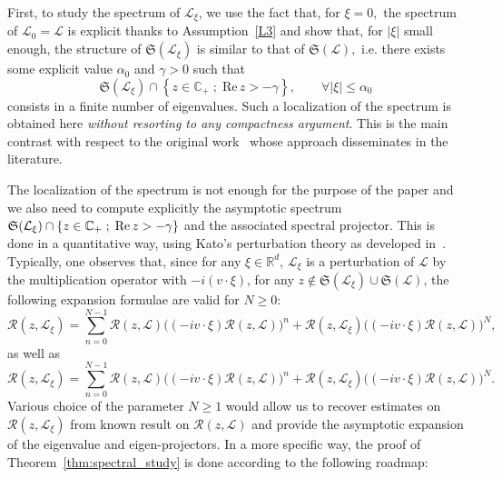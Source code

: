 \documentclass[AHL,Unicode,longabstracts,published]{cedram}
\newcommand{\re}{\mathrm{Re}\,}
\newcommand{\R}{\mathbb{R}}
\newcommand{\C}{\mathbb{C}}
\newcommand{\fkS}{\mathfrak{S}}
\newcommand{\LL}{\mathcal{L}}
\newcommand{\RR}{\mathcal{R}}
\renewcommand*\le{\leqslant}
\renewcommand*\ge{\geqslant}
\renewcommand*\geq{\geqslant}
\let\oldforall\forall
\renewcommand*{\forall}{\mathrel{\oldforall}}
\begin{document}
First, to study the spectrum of $\LL_{\xi}$, we use the fact that, for $\xi=0,$ the spectrum of $\LL_{0}=\LL$ is explicit thanks to Assumption~\eqref{L3} and show that, for $|\xi|$ small enough, the structure of $\fkS(\LL_{\xi})$ is similar to that of $\fkS(\LL),$ i.e. there exists some explicit value $\alpha_{0}$ and $\gamma >0$ such that
\[
\fkS(\LL_{\xi}) \cap \left\{z \in \C_{+}\;;\;\re z >-\gamma\right\}, \qquad \forall |\xi | \le \alpha_0
\]
consists in a finite number of eigenvalues. Such a localization of the spectrum is obtained here \emph{without resorting to any compactness argument}. This is the main contrast with respect to the original work~\cite{EP1975} whose approach disseminates in the literature.

The localization of the spectrum is not enough for the purpose of the paper and we also need to compute explicitly {the asymptotic spectrum $\fkS(\LL_{\xi}) \cap \{z \in \C_{+}\;;\;\re z >\linebreak -\gamma\}$ and the associated spectral projector}. This is done in a quantitative way, using Kato's perturbation theory as developed in~\cite{K1995}. Typically, one observes that, since for any $\xi \in \R^{d}$, $\LL_{\xi}$ is a perturbation of $\LL$ by the multiplication operator with $-i(v\cdot \xi)$, for any $z \notin \fkS(\LL_{\xi}) \cup \fkS(\LL)$, the following expansion formulae are valid for $N \ge 0$:
\begin{equation}\label{eq:factorization_L_ivxi_left}
\RR(z,\LL_{\xi}) = \sum_{n = 0}^{N-1} \RR(z,\LL) \Big((- i v \cdot \xi) \RR(z,\LL)\Big)^n + \RR(z,\LL_{\xi}) \Big((- i v \cdot \xi) \RR(z,\LL)\Big)^N,
\end{equation}
as well as
\begin{equation}\label{eq:factorization_L_ivxi_right}
\RR(z,\LL_{\xi}) = \sum_{n = 0}^{N-1} \RR(z,\LL) \Big((- i v \cdot \xi) \RR(z,\LL)\Big)^n + \RR(z,\LL_{\xi}) \Big((- i v \cdot \xi) \RR(z,\LL)\Big)^N.
\end{equation}
Various choice of the parameter $N\geq1$ would allow us to recover estimates on $\RR(z,\LL_{\xi})$ from known result on $\RR(z,\LL)$ and provide the asymptotic expansion of the eigenvalue and eigen-projectors. In a more specific way, the proof of Theorem~\ref{thm:spectral_study} is done according to the following roadmap:
\end{document}
